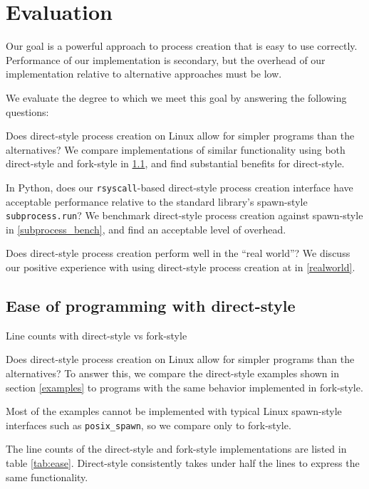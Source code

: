 \documentclass[letterpaper,twocolumn,10pt]{article}
\begin{document}
\section{Evaluation}\label{evaluation}
Our goal is a powerful approach to process creation that is easy to use correctly.
Performance of our implementation is secondary,
but the overhead of our implementation relative to alternative approaches
must be low.

We evaluate the degree to which we meet this goal by answering the following questions:
\begin{compactitem}
\item
  Does direct-style process creation on Linux allow for simpler programs than the alternatives?
  We compare implementations of similar functionality using both direct-style and fork-style in \ref{ease},
  and find substantial benefits for direct-style.
\item
  In Python, does our \texttt{rsyscall}-based direct-style process creation interface
  have acceptable performance relative to the standard library's spawn-style \texttt{subprocess.run}?
  We benchmark direct-style process creation against spawn-style in \ref{subprocess_bench},
  and find an acceptable level of overhead.
\item
  Does direct-style process creation perform well in the ``real world''?
  We discuss our positive experience with using direct-style process creation at \twosigma in \ref{realworld}.
\end{compactitem}
\subsection{Ease of programming with direct-style}\label{ease}
\begin{table}

\caption{Line counts with direct-style vs fork-style}
\label{tab:ease}
\end{table}
Does direct-style process creation on Linux allow for simpler programs than the alternatives?
To answer this, we compare the direct-style examples shown in section \ref{examples}
to programs with the same behavior implemented in fork-style.

Most of the examples cannot be implemented with typical Linux spawn-style interfaces such as \verb|posix_spawn|,
so we compare only to fork-style.

The line counts of the direct-style and fork-style implementations are listed in table \ref{tab:ease}.
Direct-style consistently takes under half the lines to express the same functionality.
\end{document}
